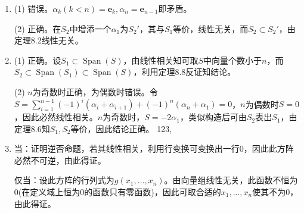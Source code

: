 \documentclass[a4paper,UTF8,fontset=windows]{ctexart}
\DeclareMathOperator{\Span}{Span}
\begin{document}
\begin{enumerate}
\item
(1) 错误。$\alpha_k(k<n)=\mathbf{e}_k,\alpha_n=\mathbf{e}_{n-1}$即矛盾。

(2) 正确。在$S_2$中增添一个$\alpha_1$为$S_2'$，其与$S_1$等价，线性无关，而$S_2\subset S_2'$，由定理8.2线性无关。

\item
(1) 正确。设$S_1\subset\Span(S)$，由线性相关知可取$S$中向量个数小于$n$，而$S_2\subset\Span(S_1)\subset\Span(S)$，利用定理8.8反证知结论。

(2) $n$为奇数时正确，为偶数时错误。令$S=\sum_{i=1}^{n-1}(-1)^i(\alpha_i+\alpha_{i+1})+(-1)^n(\alpha_n+\alpha_1)=0$，$n$为偶数时$S=0$，因此必然线性相关。$n$为奇数时，$S=-2\alpha_1$，类似构造后可由$S_2$表出$S_1$，由定理8.6知$S_1,S_2$等价，因此结论正确。
123,
\item
当：证明逆否命题，若其线性相关，利用行变换可变换出一行0，因此此方阵必然不可逆，由此得证。 

仅当：设此方阵的行列式为$g(x_1,\dots,x_n)$。由向量组线性无关，此函数不恒为0(在定义域上恒为0的函数只有零函数)，因此可取合适的$x_1,\dots,x_n$使其不为0，由此得证。
\end{enumerate}
\end{document}
